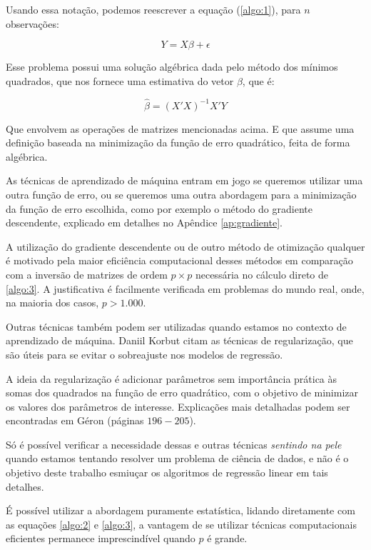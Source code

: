 Usando essa notação, podemos reescrever a equação (\ref{algo:1}), para $n$ observações:

\begin{equation}\label{algo:2}
Y = X \beta + \epsilon
\end{equation}

Esse problema possui uma solução algébrica dada pelo método dos mínimos quadrados, que nos fornece uma estimativa do vetor $\beta$, que é:

\begin{equation}\label{algo:3}
\hat{\beta} = (X'X)^{-1}X'Y
\end{equation}

Que envolvem as operações de matrizes mencionadas acima. E que assume uma definição baseada na minimização da função de erro quadrático, feita de forma algébrica. 

As técnicas de aprendizado de máquina entram em jogo se queremos utilizar uma outra função de erro, ou se queremos uma outra abordagem para a minimização da função de erro escolhida, como por exemplo o método do gradiente descendente, explicado em detalhes no Apêndice \ref{ap:gradiente}.

A utilização do gradiente descendente ou de outro método de otimização qualquer é motivado pela maior eficiência computacional desses métodos em comparação com a inversão de matrizes de ordem $p{\times}p$ necessária no cálculo direto de \ref{algo:3}. A justificativa é facilmente verificada em problemas do mundo real, onde, na maioria dos casos, $p{>}1.000$.

Outras técnicas também podem ser utilizadas quando estamos no contexto de aprendizado de máquina. Daniil Korbut \citep{korbut} citam as técnicas de regularização, que são úteis para se evitar o sobreajuste nos modelos de regressão. 

A ideia da regularização é adicionar parâmetros sem importância prática às somas dos quadrados na função de erro quadrático, com o objetivo de minimizar os valores dos parâmetros de interesse. Explicações mais detalhadas podem ser encontradas em Géron \citep{hands} (páginas $196{-}205$).

Só é possível verificar a necessidade dessas e outras técnicas \emph{sentindo na pele} quando estamos tentando resolver um problema de ciência de dados, e não é o objetivo deste trabalho esmiuçar os algoritmos de regressão linear em tais detalhes. 

É possível utilizar a abordagem puramente estatística, lidando diretamente com as equações \ref{algo:2} e \ref{algo:3}, a vantagem de se utilizar técnicas computacionais eficientes permanece imprescindível quando $p$ é grande.

